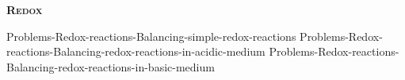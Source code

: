 \documentclass[main.tex]{subfiles}
\newcommand\chapterlabel{Ch-electrolytes}
\begin{document}
\begin{multicols*}{2}
{{\raggedright\textsc{\textbf{Redox}}\par}%
{Problems-Redox-reactions-Balancing-simple-redox-reactions}%
{Problems-Redox-reactions-Balancing-redox-reactions-in-acidic-medium}%
{Problems-Redox-reactions-Balancing-redox-reactions-in-basic-medium}%
}






\end{multicols*} \iftoggle{showfinalanswers}{
\newpage\fancyhfoffset[E,O]{0pt}
\begin{answerbox}
\begin{answersenvironment}
 \begin{localsize}{10}
{ \checkoddpage\ifoddpage    \else   \clearpage\thispagestyle{empty}\mbox{}\clearpage\fi
\Large \bf Answers}
\SetupExSheets{ headings = inline-nr , counter-format = qu) ,}
\printsolutions 
  \vspace{20cm}
 \end{localsize}
 \end{answersenvironment}
\end{answerbox}
}{}
\checkoddpage\ifoddpage   \clearpage\thispagestyle{empty}\mbox{}\clearpage \else   \fi
\end{document}
